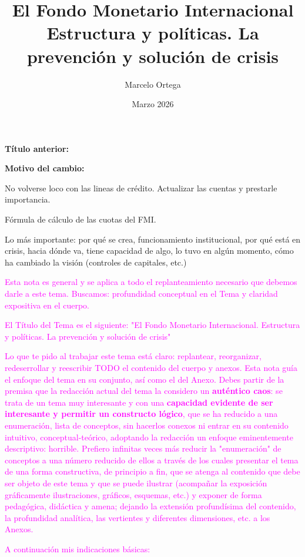 \documentclass[10pt,a4paper]{article}
\title{El Fondo Monetario Internacional\\
\large Estructura y políticas. La prevención y solución de crisis}
\author{Marcelo Ortega}
\date{Marzo 2026}
\newcommand{\puntosclave}[1]{%
  \begin{tcolorbox}[
    colframe=black,
    title={Puntos clave},
    before upper={\setlength{\parindent}{0.5cm}\setlength{\parskip}{0.5\baselineskip}}
  ]
  #1
  \end{tcolorbox}
}
\newcommand{\changebox}{%
\begin{tcolorbox}[title={Historial de cambios del tema}]
\textbf{Título anterior:} \OldTitle\par
\textbf{Motivo del cambio:} \ChangeWhy
\end{tcolorbox}
}
\newcounter{anexo}
\begin{document}
\maketitle
\changebox

\newpage

\puntosclave{ %
    No volverse loco con las lineas de crédito. Actualizar las cuentas y prestarle importancia.

    Fórmula de cálculo de las cuotas del FMI.

    Lo más importante: por qué se crea, funcionamiento institucional, por qué está en crisis, hacia dónde va, tiene capacidad de algo, lo tuvo en algún momento, cómo ha cambiado la visión (controles de capitales, etc.)


    \textcolor{magenta}{Esta nota es general y se aplica a todo el replanteamiento necesario que debemos darle a este tema. Buscamos: profundidad conceptual en el Tema y claridad expositiva en el cuerpo.

    El Título del Tema es el siguiente: "El Fondo Monetario Internacional. Estructura y políticas. La prevención y solución de crisis"

    Lo que te pido al trabajar este tema está claro: replantear, reorganizar, redeserrollar y reescribir TODO el contenido del cuerpo y anexos. Esta nota guía el enfoque del tema en su conjunto, así como el del Anexo. Debes partir de la premisa que la redacción actual del tema la considero un \textbf{auténtico caos}: se trata de un tema muy interesante y con una \textbf{capacidad evidente de ser interesante y permitir un constructo lógico}, que se ha reducido a una enumeración, lista de conceptos, sin hacerlos conexos ni entrar en su contenido intuitivo, conceptual-teórico, adoptando la redacción un enfoque eminentemente descriptivo: horrible. Prefiero infinitas veces más reducir la "enumeración" de conceptos a una número reducido de ellos a través de los cuales presentar el tema de una forma constructiva, de principio a fin, que se atenga al contenido que debe ser objeto de este tema y que se puede ilustrar (acompañar la exposición gráficamente ilustraciones, gráficos, esquemas, etc.) y exponer de forma pedagógica, didáctica y amena; dejando la extensión profundísima del contenido, la profundidad analítica, las vertientes y diferentes dimensiones, etc. a los Anexos.
    
    A continuación mis indicaciones básicas:
    
}}
\end{document}
